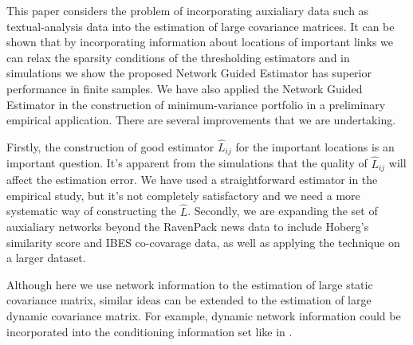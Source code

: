 This paper considers the problem of incorporating auxialiary data such as textual-analysis data into the estimation of large covariance matrices. It can be shown that by incorporating information about locations of important links we can relax the sparsity conditions of the thresholding estimators and in simulations we show the proposed Network Guided Estimator has superior performance in finite samples. We have also applied the Network Guided Estimator in the construction of minimum-variance portfolio in a preliminary empirical application. There are several improvements that we are undertaking.

Firstly, the construction of good estimator \(\hat{L}_{ij}\) for the important locations is an important question. It's apparent from the simulations that the quality of \(\hat{L}_{ij}\) will affect the estimation error. We have used a straightforward estimator in the empirical study, but it's not completely satisfactory and we need a more systematic way of constructing the \(\hat{L}\). Secondly, we are expanding the set of auxialiary networks beyond the RavenPack news data to include Hoberg's similarity score and IBES co-covarage data, as well as applying the technique on a larger dataset. 





Although here we use network information to the estimation of large static covariance matrix, similar ideas can be extended to the estimation of large dynamic covariance matrix. For example, dynamic network information could be incorporated into the conditioning information set like in \cite{chen2019new}.
